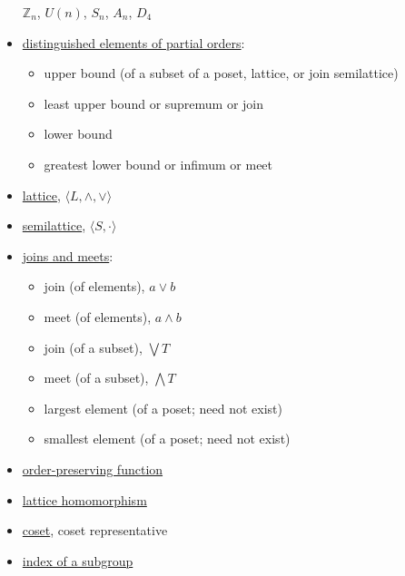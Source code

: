 \documentclass[12pt]{article}
\newcommand{\boldemph}[1]{#1}
\newcommand\<{\ensuremath{\langle}}
\renewcommand\>{\ensuremath{\rangle}}
\newcommand\meet{\ensuremath{\wedge}}
\newcommand\join{\ensuremath{\vee}}
\begin{document}
\begin{itemize}
$\mathbb{Z}_n$, $U(n)$, $S_n$, $A_n$, $D_4$
\item \href{http://en.wikipedia.org/wiki/List_of_order_theory_topics#Distinguished_elements_of_partial_orders}{distinguished elements of partial orders}: 
  \begin{itemize}
  \item 
\boldemph{upper bound} (of a subset of a poset, lattice, or join semilattice)
\item \boldemph{least upper bound} or \boldemph{supremum} or join
\item \boldemph{lower bound}
\item \boldemph{greatest lower bound} or \boldemph{infimum} or meet
  \end{itemize}
\item \href{http://en.wikipedia.org/wiki/Lattice_(order)}{\boldemph{lattice}}, $\<L, \meet, \join\>$
\item \href{http://en.wikipedia.org/wiki/Semilattice}{\boldemph{semilattice}}, $\<S, \cdot\>$
\item \href{http://en.wikipedia.org/wiki/Join_and_meet}{joins and meets}:
  \begin{itemize}
  \item 
      {\boldemph{join}} (of elements), $a\join b$
\item \boldemph{meet} (of elements), $a\meet b$
\item \boldemph{join} (of a subset), $\bigvee T$
\item \boldemph{meet} (of a subset), $\bigwedge T$
\item \boldemph{largest element} (of a poset; need not exist)
\item \boldemph{smallest element} (of a poset; need not exist)
  \end{itemize}
\item \href{http://en.wikipedia.org/wiki/Monotonic_function#order-preserving}{order-preserving function}
\item \href{http://en.wikipedia.org/wiki/Lattice_(order)#Morphisms_of_lattices}{lattice homomorphism}
\item \href{http://en.wikipedia.org/wiki/Coset}{coset}, 
\href{http://en.wikipedia.org/wiki/Coset#General_properties}{\boldemph}{coset representative}
\item \href{http://en.wikipedia.org/wiki/Index_of_a_subgroup}{\boldemph{index} of a subgroup}

\end{itemize}
\end{document}
